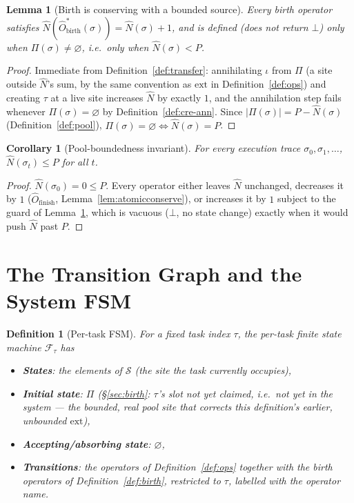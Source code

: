 \documentclass[11pt,a4paper]{report}
\newtheorem{lemma}[theorem]{Lemma}
\newtheorem{corollary}[theorem]{Corollary}
\newtheorem{definition}{Definition}[section]
\newcommand{\Num}{\hat{N}}
\begin{document}
\begin{lemma}[Birth is conserving with a bounded source]
\label{lem:birth-conserve}
Every birth operator satisfies
$\Num(\hat{O}_{\text{birth}}^{\ast}(\sigma)) = \Num(\sigma) + 1$, and
is defined (does not return $\bot$) only when $\Pi(\sigma) \neq
\varnothing$, i.e.\ only when $\Num(\sigma) < P$.
\end{lemma}

\begin{proof}
Immediate from Definition~\ref{def:transfer}: annihilating $\iota$
from $\Pi$ (a site outside $\Num$'s sum, by the same convention as
$\text{ext}$ in Definition~\ref{def:ops}) and creating $\tau$ at a live
site increases $\Num$ by exactly $1$, and the annihilation step fails
whenever $\Pi(\sigma) = \varnothing$ by Definition~\ref{def:cre-ann}.
Since $|\Pi(\sigma)| = P - \Num(\sigma)$
(Definition~\ref{def:pool}), $\Pi(\sigma) = \varnothing \iff
\Num(\sigma) = P$.
\end{proof}

\begin{corollary}[Pool-boundedness invariant]
\label{cor:pool-bound}
For every execution trace $\sigma_0, \sigma_1, \ldots$,
$\Num(\sigma_t) \leq P$ for all $t$.
\end{corollary}

\begin{proof}
$\Num(\sigma_0) = 0 \leq P$. Every operator either leaves $\Num$
unchanged, decreases it by $1$ ($\hat{O}_{\text{finish}}$,
Lemma~\ref{lem:atomicconserve}), or increases it by $1$ subject to the
guard of Lemma~\ref{lem:birth-conserve}, which is vacuous
($\bot$, no state change) exactly when it would push $\Num$ past $P$.
\end{proof}

\section{The Transition Graph and the System FSM}

\begin{definition}[Per-task FSM]
\label{def:fsm-task}
For a fixed task index $\tau$, the \emph{per-task finite state
machine} $\mathcal{F}_\tau$ has
\begin{itemize}
  \item \textbf{States}: the elements of $\mathcal{S}$ (the site the task currently occupies),
  \item \textbf{Initial state}: $\Pi$ (\S\ref{sec:birth}: $\tau$'s slot
        not yet claimed, i.e.\ not yet in the system --- the bounded,
        real pool site that corrects this definition's earlier,
        unbounded $\text{ext}$),
  \item \textbf{Accepting/absorbing state}: $\varnothing$,
  \item \textbf{Transitions}: the operators of Definition~\ref{def:ops}
        together with the birth operators of Definition~\ref{def:birth},
        restricted to $\tau$, labelled with the operator name.
\end{itemize}
\end{definition}
\end{document}
